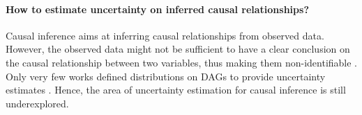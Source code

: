 \paragraph{How to estimate uncertainty on inferred causal relationships?} Causal inference aims at inferring causal relationships from observed data. However, the observed data might not be sufficient to have a clear conclusion on the causal relationship between two variables, thus making them non-identifiable \cite{pearl2009causality}. Only very few works defined distributions on DAGs to provide uncertainty estimates \cite{charpentier2022dpdag}. Hence, the area of uncertainty estimation for causal inference is still underexplored.













